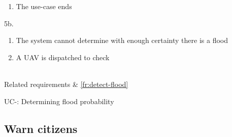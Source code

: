 \begin{table}[H]
{{\begin{enumerate}
		  \item The use-case ends
		\end{enumerate}
		\item[5b.]
		\begin{enumerate}
		  \item The system cannot determine with enough certainty there is a flood
		  \item A UAV is dispatched to check
		\end{enumerate}
		}\\
	Related requirements & \ref{fr:detect-flood} \\
}
\caption{UC-: Determining flood probability}
\label{table:uc-determine-flood-probability}
\end{table}

\clearpage
\subsection{Warn citizens}

